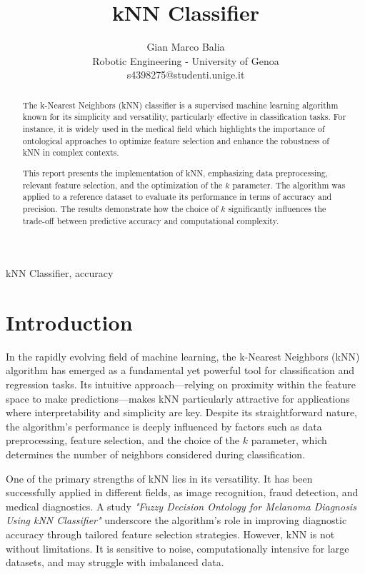 \documentclass[9pt,technote]{IEEEtran}
\title{kNN Classifier}
\author{
	Gian Marco Balia\\
	Robotic Engineering - University of Genoa\\
	s4398275@studenti.unige.it
}
\begin{document}
\maketitle

\begin{abstract} 
The k-Nearest Neighbors (kNN) classifier is a supervised machine learning algorithm known for its simplicity and versatility, particularly effective in classification tasks. For instance, it is widely used in the medical field which highlights the importance of ontological approaches to optimize feature selection and enhance the robustness of kNN in complex contexts.

This report presents the implementation of kNN, emphasizing data preprocessing, relevant feature selection, and the optimization of the $k$ parameter. The algorithm was applied to a reference dataset to evaluate its performance in terms of accuracy and precision. The results demonstrate how the choice of $k$ significantly influences the trade-off between predictive accuracy and computational complexity.

\end{abstract}
\begin{IEEEkeywords}
 kNN Classifier, accuracy
\end{IEEEkeywords}

\section{Introduction}
In the rapidly evolving field of machine learning, the k-Nearest Neighbors (kNN) algorithm has emerged as a fundamental yet powerful tool for classification and regression tasks. Its intuitive approach—relying on proximity within the feature space to make predictions—makes kNN particularly attractive for applications where interpretability and simplicity are key. Despite its straightforward nature, the algorithm’s performance is deeply influenced by factors such as data preprocessing, feature selection, and the choice of the $k$ parameter, which determines the number of neighbors considered during classification.

One of the primary strengths of kNN lies in its versatility. It has been successfully applied in different fields, as image recognition, fraud detection, and medical diagnostics. A study \textit{"Fuzzy Decision Ontology for Melanoma Diagnosis Using kNN Classifier"} \cite{abbes2021FuzzyDecisionOntology} underscore the algorithm’s role in improving diagnostic accuracy through tailored feature selection strategies. However, kNN is not without limitations. It is sensitive to noise, computationally intensive for large datasets, and may struggle with imbalanced data.
\end{document}
